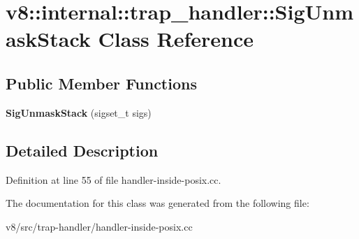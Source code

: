 \hypertarget{classv8_1_1internal_1_1trap__handler_1_1SigUnmaskStack}{}\section{v8\+:\+:internal\+:\+:trap\+\_\+handler\+:\+:Sig\+Unmask\+Stack Class Reference}
\label{classv8_1_1internal_1_1trap__handler_1_1SigUnmaskStack}
\subsection*{Public Member Functions}
\begin{DoxyCompactItemize}
\item 
\mbox{\label{classv8_1_1internal_1_1trap__handler_1_1SigUnmaskStack_a781be70457f68e447af1448027d6a5bd}} 
{\bfseries Sig\+Unmask\+Stack} (sigset\+\_\+t sigs)
\end{DoxyCompactItemize}


\subsection{Detailed Description}


Definition at line 55 of file handler-\/inside-\/posix.\+cc.



The documentation for this class was generated from the following file\+:\begin{DoxyCompactItemize}
\item 
v8/src/trap-\/handler/handler-\/inside-\/posix.\+cc\end{DoxyCompactItemize}
